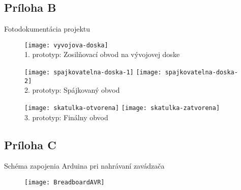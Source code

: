 \documentclass[titlepage,12pt]{article}
\begin{document}
\newpage 
\subsection*{Príloha B}
Fotodokumentácia projektu
\begin{figure}[!ht]
\begin{center}
\texttt{[image: vyvojova-doska]}
\\1. prototyp: Zosilňovací obvod na vývojovej doske
\end{center}
\end{figure}

\begin{figure}[!ht]
\begin{center}
\texttt{[image: spajkovatelna-doska-1]}
\texttt{[image: spajkovatelna-doska-2]}
\\2. prototyp: Spájkovaný obvod
\end{center}
\end{figure}

\begin{figure}[!ht]
\begin{center}
\texttt{[image: skatulka-otvorena]}
\texttt{[image: skatulka-zatvorena]}
\\3. prototyp: Finálny obvod
\end{center}
\end{figure}

\newpage
\subsection*{Príloha C}
Schéma zapojenia Arduina pri nahrávaní zavádzača
\begin{figure}[!ht]
\texttt{[image: BreadboardAVR]}
\end{figure}
\end{document}
